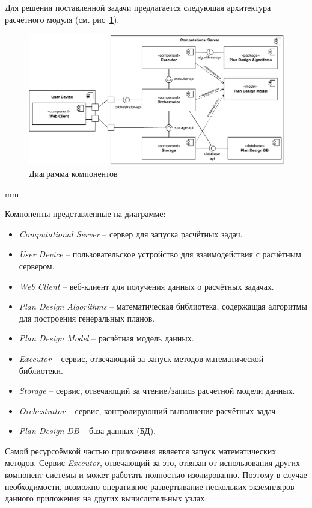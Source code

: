 Для решения поставленной задачи предлагается следующая архитектура расчётного модуля
(см. рис\ \ref{pic:architecture__common-component}).

\begin{figure}[H]
	\hspace*{-2.5 cm}\includegraphics[width=1.2\textwidth, left]{architecture/pictures/common/component}
	\caption{Диаграмма компонентов}
	\label{pic:architecture__common-component}
\end{figure}
 mm

\noindent Компоненты представленные на диаграмме:
\begin{itemize}
	\item \textit{Computational Server} -- сервер для запуска расчётных задач.
	\item \textit{User Device} -- пользовательское устройство для взаимодействия с расчётным сервером.
	\item \textit{Web Client} -- веб-клиент для получения данных о расчётных задачах.
	\item \textit{Plan Design Algorithms} -- математическая библиотека, содержащая алгоритмы
	для построения генеральных планов.
	\item \textit{Plan Design Model} -- расчётная модель данных.
	\item \textit{Executor} -- сервис, отвечающий за запуск методов математической библиотеки.
	\item \textit{Storage} -- сервис, отвечающий за чтение/запись расчётной модели данных.
	\item \textit{Orchestrator} -- сервис, контролирующий выполнение расчётных задач.
	\item \textit{Plan Design DB} -- база данных (БД).
\end{itemize}

Самой ресурсоёмкой частью приложения является запуск математических методов.
Сервис \textit{Executor}, отвечающий за это, отвязан от использования других компонент системы
и может работать полностью изолированно.
Поэтому в случае необходимости, возможно оперативное развертывание нескольких экземпляров данного приложения
на других вычислительных узлах.

